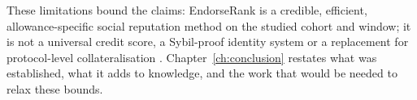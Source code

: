 These limitations bound the claims: EndorseRank is a credible, efficient, allowance-specific social reputation method on the studied cohort and window; it is not a universal credit score, a Sybil-proof identity system or a replacement for protocol-level collateralisation . Chapter~\ref{ch:conclusion} restates what was established, what it adds to knowledge, and the work that would be needed to relax these bounds.
